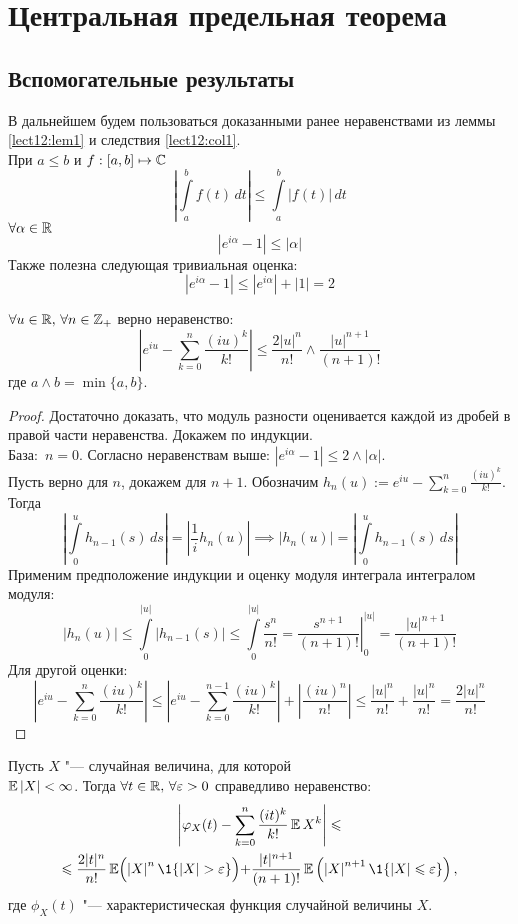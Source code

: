 
\section{Центральная предельная теорема}
\subsection{Вспомогательные результаты}

В дальнейшем будем пользоваться доказанными ранее неравенствами из леммы \ref{lect12:lem1} и следствия \ref{lect12:col1}.\\ При $a \leqslant b$ и $ f: [a,b] \mapsto \mathbb{C}$
$$
\left| \int\limits_a^b f(t)\,dt\right| \leqslant \int\limits_a^b\left| f(t)\right|\,dt
$$
$ \forall \alpha \in \mathbb{R}$
$$
\left| e^{i\alpha} - 1\right| \leqslant \left|\alpha\right|
$$
Также полезна следующая тривиальная оценка:
$$
\left| e^{i\alpha} - 1\right| \leqslant \left| e^{i\alpha}\right| + \left|1\right| = 2
$$
\begin{lemma}\label{lect13:lemma1}
$\forall u \in \mathbb{R}, \, \forall n \in \mathbb{Z}_+$ верно неравенство:
$$
\left| e^{iu} - \sum_{k = 0}^n \frac{(iu)^k}{k!}\right| \leqslant \frac{2|u|^n}{n!} \wedge \frac{|u|^{n+1}}{(n+1)!}
$$
где $a \wedge b = \min \{a, b\}$.
\end{lemma}
\begin{proof}
Достаточно доказать, что модуль разности оценивается каждой из дробей в правой части неравенства. Докажем по индукции.\\ База:~$n = 0$. Согласно неравенствам выше: $\left| e^{i\alpha} - 1\right| \leqslant 2 \wedge \left|\alpha\right|$. \\Пусть верно для $n$, докажем для $n+1$. Обозначим $h_n(u) := e^{iu} - \sum\limits_{k = 0}^n \frac{(iu)^k}{k!}$. Тогда
$$
\left| \int\limits_0^u h_{n-1}(s)\,ds\right| = \left|\frac{1}{i}h_n(u)\right| \implies \left|h_n(u)\right| = \left| \int\limits_0^u h_{n-1}(s)\,ds\right|
$$
Применим предположение индукции и оценку модуля интеграла интегралом модуля:
$$
\left|h_n(u)\right| \leqslant \int\limits_0^{|u|} \left| h_{n-1}(s) \right| \leqslant \int\limits_0^{|u|} \frac{s^n}{n!} = \left. \frac{s^{n+1}}{(n+1)!} \right|_0^{|u|} = \frac{|u|^{n+1}}{(n+1)!}
$$
Для другой оценки:
$$
\left| e^{iu} - \sum_{k = 0}^n \frac{(iu)^k}{k!}\right| \leqslant \left| e^{iu} - \sum_{k = 0}^{n-1} \frac{(iu)^k}{k!}\right| + \left|\frac{(iu)^n}{n!}\right| \leqslant \frac{|u|^n}{n!} + \frac{|u|^n}{n!} = \frac{2|u|^n}{n!}
$$
\end{proof}
\begin{col}
Пусть $X$ "--- случайная величина, для которой\\ $\operatorname*{\mathbb{E}}\left|X\right| < \infty$. Тогда $\forall t \in \mathbb{R}, \, \forall \varepsilon > 0$ справедливо неравенство:
\begin{multline*}
\left| \phi_X(t) - \sum_{k = 0}^n \frac{(it)^k}{k!}\E X^k\right| \leqslant \\ \leqslant
\frac{2|t|^n}{n!}\E\Bigl(\left|X\right|^n\1\{\left|X\right| > \eps\} \Bigl) + \frac{|t|^{n+1}}{(n+1)!}\E\left(\left|X\right|^{n+1}\1\{\left|X\right| \leqslant \eps\} \right),
\end{multline*}
где $\phi_X(t)$ "--- характеристическая функция случайной величины $X$.
\end{col}
